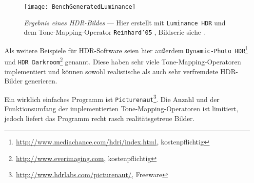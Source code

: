\begin{figure}
  \begin{center}
    \texttt{[image: BenchGeneratedLuminance]}
    \caption{\textit{Ergebnis eines HDR-Bildes} --- Hier erstellt mit \texttt{Luminance HDR} und dem \gls{Tone-Mapping}-Operator \texttt{Reinhard'05} \cite{Reinhard05}, Bildserie siehe \cite{tellone}.}
    \label{fig:luminance}
  \end{center}
\end{figure}

Als weitere Beispiele für \gls{HDR}-Software seien hier außerdem \texttt{Dynamic-Photo HDR}\footnote{\url{http://www.mediachance.com/hdri/index.html}, kostenpflichtig} und \texttt{HDR Darkroom}\footnote{\url{http://www.everimaging.com}, kostenpflichtig} genannt. Diese haben sehr viele \gls{Tone-Mapping}-Operatoren implementiert und können sowohl realistische als auch sehr verfremdete \gls{HDR}-Bilder generieren. 

Ein wirklich einfaches Programm ist \texttt{Picturenaut}\footnote{\url{http://www.hdrlabs.com/picturenaut/}, Freeware}. Die Anzahl und der Funktionsumfang der implementierten \gls{Tone-Mapping}-Operatoren ist limitiert, jedoch liefert das Programm recht rasch realitätsgetreue Bilder.



